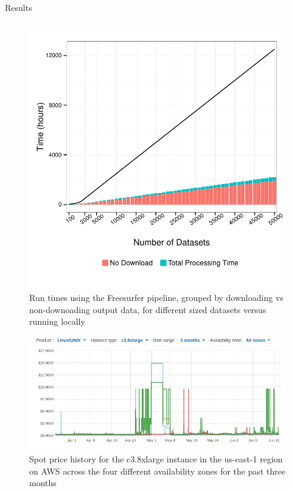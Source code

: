\documentclass[final,hyperref={pdfpagelabels=false}]{beamer}
\begin{document}
\begin{frame}
\begin{columns}
\begin{column}{.5\textwidth}
{\begin{block}{Results}
\begin{column}{.47\textwidth}
\begin{figure}
                  \includegraphics[width=.99\textwidth]{fs-times.pdf}
                  \caption{\label{fig:fs-times}Run times using the Freesurfer pipeline, grouped by downloading vs non-downoading output data, for different sized datasets versus running locally}
              \end{figure}
              \begin{figure}
                  \includegraphics[width=.99\textwidth]{spot_history.png}
                  \caption{\label{fig:spot_history}Spot price history for the c3.8xlarge instance in the us-east-1 region on AWS across the four different availability zones for the past three months}
              \end{figure}

\end{column}
\end{block}}
\end{column}
\end{columns}
\end{frame}
\end{document}
